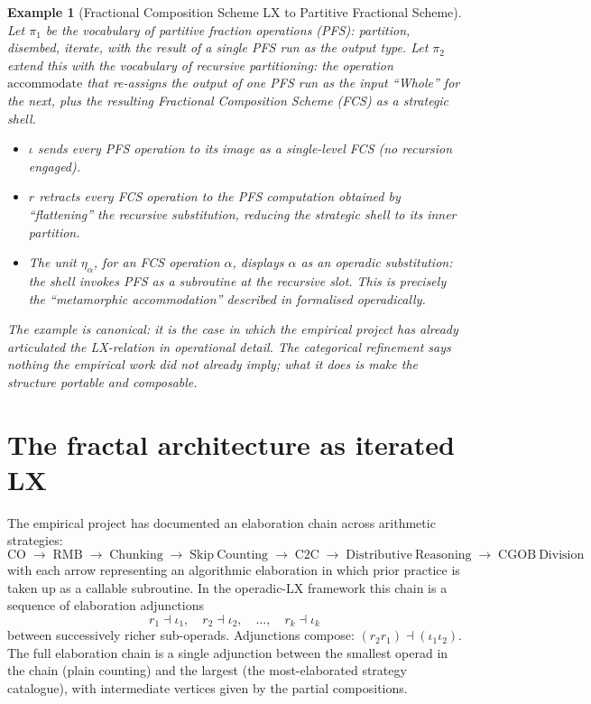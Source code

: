 \documentclass[11pt]{article}
\newtheorem{example}{Example}
\begin{document}
\begin{example}[Fractional Composition Scheme LX to Partitive
Fractional Scheme]\label{ex:fcs}
Let $\pi_1$ be the vocabulary of partitive fraction operations
(PFS): partition, disembed, iterate, with the result of a single
PFS run as the output type. Let $\pi_2$ extend this with the
vocabulary of recursive partitioning: the operation
$\mathrm{accommodate}$ that re-assigns the output of one PFS run as
the input ``Whole'' for the next, plus the resulting Fractional
Composition Scheme (FCS) as a strategic shell.
\begin{itemize}[noitemsep,topsep=2pt]
  \item $\iota$ sends every PFS operation to its image as a
        single-level FCS (no recursion engaged).
  \item $r$ retracts every FCS operation to the PFS computation
        obtained by ``flattening'' the recursive substitution,
        reducing the strategic shell to its inner partition.
  \item The unit $\eta_\alpha$, for an FCS operation $\alpha$,
        displays $\alpha$ as an operadic substitution: the shell
        invokes PFS as a subroutine at the recursive slot. This is
        precisely the ``metamorphic accommodation'' described in
        \textcite{steffeOlive2010, hackenberg2007} formalised
        operadically.
\end{itemize}
The example is canonical: it is the case in which the empirical
project has already articulated the LX-relation in operational
detail. The categorical refinement says nothing the empirical work
did not already imply; what it does is make the structure portable
and composable.
\end{example}

\section{The fractal architecture as iterated LX}

The empirical project has documented an elaboration chain across
arithmetic strategies:
\[
\mathrm{CO} \;\to\; \mathrm{RMB} \;\to\; \mathrm{Chunking} \;\to\;
\mathrm{Skip\ Counting} \;\to\; \mathrm{C2C} \;\to\;
\mathrm{Distributive\ Reasoning} \;\to\; \mathrm{CGOB\ Division}
\]
with each arrow representing an algorithmic elaboration in which
prior practice is taken up as a callable subroutine. In the
operadic-LX framework this chain is a sequence of elaboration adjunctions
\[
r_1 \dashv \iota_1,\quad r_2 \dashv \iota_2,\quad \dots,\quad
r_k \dashv \iota_k
\]
between successively richer sub-operads. Adjunctions compose:
$(r_2 r_1) \dashv (\iota_1 \iota_2)$. The full elaboration chain is a
single adjunction between the smallest operad in the chain
(plain counting) and the largest (the most-elaborated strategy
catalogue), with intermediate vertices given by the partial
compositions.
\end{document}
